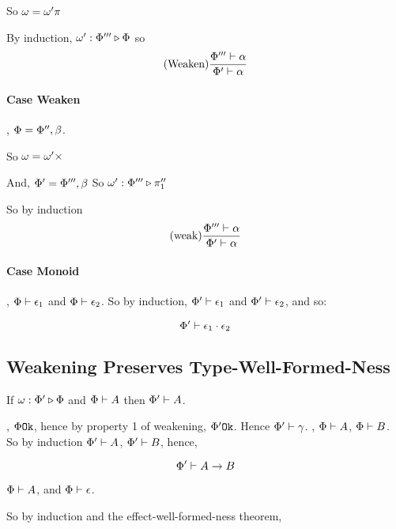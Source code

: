 {    So $\omega = \omega'\pi$

    By induction, $\omega' : \Phi''' \triangleright \Phi$
    so \begin{equation}
        (\text{Weaken}) \frac{\Phi'''\vdash \alpha}{\Phi'\vdash \alpha}
    \end{equation}

    \paragraph{Case Weaken}

    \bi, $\Phi = \Phi'', \beta$.

    So $\omega = \omega'\times$

    And, $\Phi' = \Phi''', \beta$
    So \bi $\omega' : \Phi''' \triangleright \pi_1''$

    So by induction
    \begin{equation}
        (\text{weak}) \frac{\Phi'''\vdash \alpha}{\Phi'\vdash \alpha}
    \end{equation}


    \paragraph{Case Monoid}

    \bi, $\Phi\vdash \epsilon_1$ and $\Phi\vdash \epsilon_2$. So by induction,
    $\Phi'\vdash \epsilon_1$ and $\Phi'\vdash \epsilon_2$, and so:

    \begin{equation}
        \Phi'\vdash \epsilon_1\cdot\epsilon_2
    \end{equation}
    \subsection{Weakening Preserves Type-Well-Formed-Ness}

    If $\omega : \Phi' \triangleright \Phi$ and $\Phi\vdash A$ then $\Phi'\vdash A$.

    \proof
    \bi, $\Phi \texttt{Ok}$, hence by property 1 of weakening, $\Phi' \texttt{Ok}$. Hence $\Phi'\vdash \gamma$.
    \bi, $\Phi\vdash A$, $\Phi\vdash B$.
    So by induction $\Phi'\vdash A$, $\Phi'\vdash B$, hence,

    $$\Phi'\vdash A\rightarrow B$$


    \bi $\Phi\vdash A$, and $\Phi\vdash \epsilon$.

    So by induction and the effect-well-formed-ness theorem, 

}
